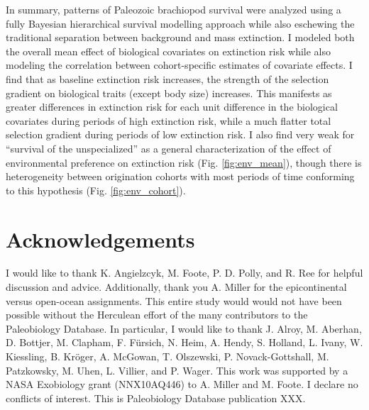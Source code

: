 \documentclass{article}
\begin{document}
In summary, patterns of Paleozoic brachiopod survival were analyzed using a fully Bayesian hierarchical survival modelling approach while also eschewing the traditional separation between background and mass extinction. I modeled both the overall mean effect of biological covariates on extinction risk while also modeling the correlation between cohort-specific estimates of covariate effects. I find that as baseline extinction risk increases, the strength of the selection gradient on biological traits (except body size) increases. This manifests as greater differences in extinction risk for each unit difference in the biological covariates during periods of high extinction risk, while a much flatter total selection gradient during periods of low extinction risk. I also find very weak for ``survival of the unspecialized'' \citep{Simpson1944,Liow2004a,Liow2007b,Nurnberg2013a,Nurnberg2015} as a general characterization of the effect of environmental preference on extinction risk (Fig. \ref{fig:env_mean}), though there is heterogeneity between origination cohorts with most periods of time conforming to this hypothesis (Fig. \ref{fig:env_cohort}). 


\section*{Acknowledgements}
I would like to thank K. Angielzcyk, M. Foote, P. D. Polly, and R. Ree for helpful discussion and advice. Additionally, thank you A. Miller for the epicontinental versus open-ocean assignments. This entire study would would not have been possible without the Herculean effort of the many contributors to the Paleobiology Database. In particular, I would like to thank J. Alroy, M. Aberhan, D. Bottjer, M. Clapham, F. F\"{u}rsich, N. Heim, A. Hendy, S. Holland, L. Ivany, W. Kiessling, B. Kr\"{o}ger, A. McGowan, T. Olszewski, P. Novack-Gottshall, M. Patzkowsky, M. Uhen, L. Villier, and P. Wager. This work was supported by a NASA Exobiology grant (NNX10AQ446) to A. Miller and M. Foote. I declare no conflicts of interest. This is Paleobiology Database publication XXX.

\clearpage




\clearpage
\end{document}
